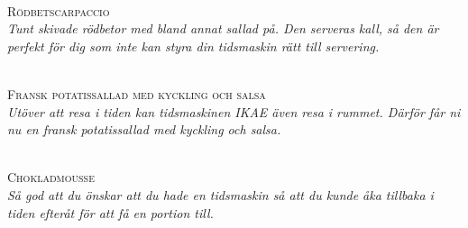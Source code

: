

\begingroup
{}
\begin{center}

\vfil

\newcommand\blockA[1]{\parbox[c][0.23\textheight][c]{0.4\textwidth}{\centering #1}}
\newcommand\blockB[1]{\parbox[c][0.23\textheight][c]{0.6\textwidth}{\raggedright #1}}

\LARGE\textsc{}\\
\large\textsc{Rödbetscarpaccio}\\
\normalsize\textit{Tunt skivade rödbetor med bland annat sallad på. Den serveras kall, så den är perfekt för dig som inte kan styra din tidsmaskin rätt till servering.}

\vfill

\LARGE\textsc{}\\
\large\textsc{Fransk potatissallad med kyckling och salsa}\\ 
\normalsize\textit{Utöver att resa i tiden kan tidsmaskinen IKAE även resa i rummet. Därför får ni nu en fransk potatissallad med kyckling och salsa.}

\vfill

\LARGE\textsc{}\\
\large\textsc{Chokladmousse}\\ 
\normalsize\textit{Så god att du önskar att du hade en tidsmaskin så att du kunde åka tillbaka i tiden efteråt för att få en portion till.}
\vspace{\fill}

\hspace*{\fill}
\hspace*{\fill}

\end{center}
\endgroup
